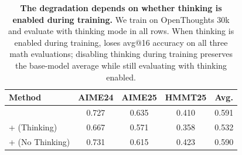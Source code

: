 \begin{table}[t]
\centering
\caption{\textbf{The degradation depends on whether thinking is enabled during \opsd{} training.}
We train on OpenThoughts 30k and evaluate with thinking mode in all rows. When thinking is enabled during \opsd{} training, \qwenfourb{} loses avg@16 accuracy on all three math evaluations; disabling thinking during training preserves the base-model average while still evaluating with thinking enabled.}
\label{tab:openthoughts_thinking_enabled_disabled}
\small
\setlength{\tabcolsep}{8pt}
\renewcommand{\arraystretch}{1.15}
\begin{tabular*}{\linewidth}{@{\extracolsep{\fill}}lcccc@{}}
\toprule
\textbf{Method}
& \textbf{AIME24}
& \textbf{AIME25}
& \textbf{HMMT25}
& \textbf{Avg.} \\
\midrule
\qwenfourb{}
& 0.727
& 0.635
& 0.410
& 0.591 \\
+\opsd{} (Thinking)
& 0.667
& 0.571
& 0.358
& 0.532 \\
+\opsd{} (No Thinking)
& 0.731
& 0.615
& 0.423
& 0.590 \\
\bottomrule
\end{tabular*}
\end{table}
